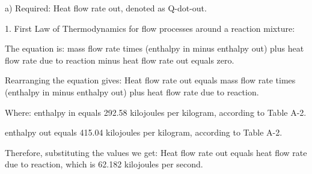 a) Required: Heat flow rate out, denoted as Q-dot-out.

1. First Law of Thermodynamics for flow processes around a reaction mixture:

The equation is:
mass flow rate times (enthalpy in minus enthalpy out) plus heat flow rate due to reaction minus heat flow rate out equals zero.

Rearranging the equation gives:
Heat flow rate out equals mass flow rate times (enthalpy in minus enthalpy out) plus heat flow rate due to reaction.

Where:
enthalpy in equals 292.58 kilojoules per kilogram, according to Table A-2.

enthalpy out equals 415.04 kilojoules per kilogram, according to Table A-2.

Therefore, substituting the values we get:
Heat flow rate out equals heat flow rate due to reaction, which is 62.182 kilojoules per second.